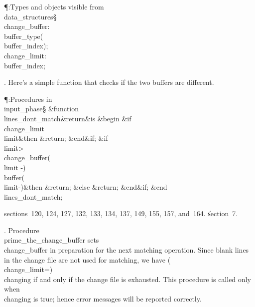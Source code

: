 \Y\P\?\4:Types and objects visible from \\{data\_structures}\X\mathrel{+}\S%
\?\6
\\{change\_buffer}\?:\?\\{buffer\_type}\?\1(\?\\{buffer\_index}\?\2)\?;\6
\\{change\_limit}\?:\?\\{buffer\_index};\par
\fi

. Here's a simple function that checks if the two buffers are different.

\Y\P\?\4:Procedures in \\{input\_phase}\X\S\?\6
\&{function}\8\1\\{lines\_dont\_match}\?\8\&{return}\?\8\2\8\&{is}\8%
\1\6
\4\&{begin}\6
\&{if}\1\1\8\\{change\_limit}\?\I\?\\{limit}\2\8\&{then}\6
\?\&{return}\?\8;\2\6
\&{end}\8\2\&{if}\1;\6
\&{if}\1\1\8\\{limit}\?>\?\ANT\?\\{change\_buffer}\?\1(\?\to\?\\{limit}%
\?-\?\2)\I\?\\{buffer}\?\1(\?\to\?\\{limit}\?-\?\2)\?\2\8\&{then}\6
\?\&{return}\?\8;\6
\4\&{else}\6
\?\&{return}\?\8;\2\6
\&{end}\8\2\&{if}\1;\2\6
\&{end}\8\\{lines\_dont\_match};\par
\A sections~120, 124, 127, 132, 133, 134, 137, 149, 155, 157, and~164.
\U section~7\*.\fi

. Procedure \\{prime\_the\_change\_buffer} sets \\{change\_buffer} in
preparation
for the next matching operation. Since blank lines in the change file are
not used for matching, we have \?(\?\\{change\_limit}\?=\?)\W\R\?%
\\{changing} if and
only if the change file is exhausted. This procedure is called only
when \\{changing} is true; hence error messages will be reported correctly.


